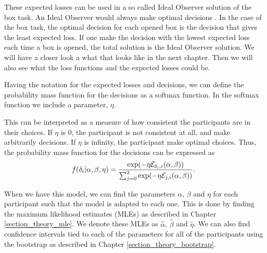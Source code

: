 These expected losses can be used in a so called Ideal Observer solution of the box task. An Ideal Observer would always make optimal decisions \citep{idealObs}. In the case of the box task, the optimal decision for each opened box is the decision that gives the least expected loss. If one make the decision with the lowest expected loss each time a box is opened, the total solution is the Ideal Observer solution. We will have a closer look a what that looks like in the next chapter. Then we will also see what the loss functions and the expected losses could be.


Having the notation for the expected losses and decisions, we can define the probability mass function for the decisions as a softmax function. In the softmax function we include a parameter, $\eta$. 


This can be interpreted as a measure of how consistent the participants are in their choices. If $\eta$ is 0, the participant is not consistent at all, and make arbitrarily decisions. If $\eta$ is infinity, the participant make optimal choices. Thus, the probability mass function for the decisions can be expressed as
\begin{equation}
\label{softmax_real}
    f(\delta_{i}|\alpha,\beta,\eta) = \frac{\text{exp}(- \eta \mathcal{E}_{\delta_{i},i}(\alpha,\beta))}{\sum_{j=0}^{2} \text{exp}(-\eta \mathcal{E}_{j,i}(\alpha,\beta))}.
\end{equation}

When we have this model, we can find the parameters $\alpha$, $\beta$ and $\eta$ for each participant such that the model is adapted to each one. This is done by finding the maximum likelihood estimates (MLEs) as described in Chapter \ref{section_theory_mle}. We denote these MLEs as $\hat{\alpha}$, $\hat{\beta}$ and $\hat{\eta}$. We can also find confidence intervals tied to each of the parameters for all of the participants using the bootstrap as described in Chapter \ref{section_theory_bootstrap}. 








